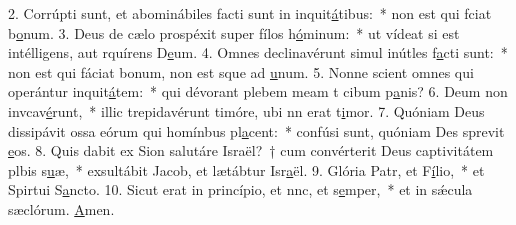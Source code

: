 2. Corrúpti sunt, et abominábiles facti sunt in inquit\uline{á}tibus:~* non est qui fciat b\uline{o}num.
3. Deus de cælo prospéxit super fílos h\uline{ó}minum:~* ut vídeat si est intélligens, aut rquírens D\uline{e}um.
4. Omnes declinavérunt simul inútles f\uline{a}cti sunt:~* non est qui fáciat bonum, non est sque ad \uline{u}num.
5. Nonne scient omnes qui operántur inquit\uline{á}tem:~* qui dévorant plebem meam t cibum p\uline{a}nis?
6. Deum non invcav\uline{é}runt,~* illic trepidavérunt timóre, ubi nn erat t\uline{i}mor.
7. Quóniam Deus dissipávit ossa eórum qui homínbus pl\uline{a}cent:~* confúsi sunt, quóniam Des sprevit \uline{e}os.
8. Quis dabit ex Sion salutáre Israël?~† cum convérterit Deus captivitátem plbis s\uline{u}æ,~* exsultábit Jacob, et lætábtur Isr\uline{a}ël.
9. Glória Patr, et F\uline{í}lio,~* et Spirtui S\uline{a}ncto.
10. Sicut erat in princípio, et nnc, et s\uline{e}mper,~* et in sǽcula sæclórum. \uline{A}men.
